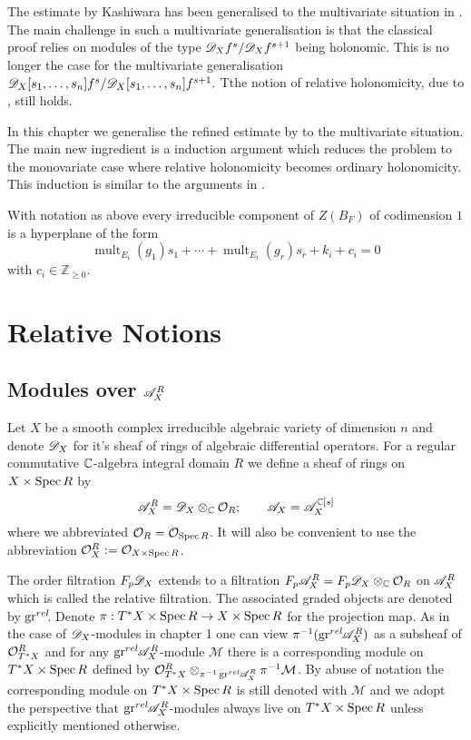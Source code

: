 The estimate by Kashiwara has been generalised to the multivariate situation in \cite{budur2020zero}.
The main challenge in such a multivariate generalisation is that the classical proof relies on modules of the type $\mathscr{D}_X f^{s}/ \mathscr{D}_X f^{s+1}$ being holonomic.
This is no longer the case for the multivariate generalisation $\mathscr{D}_X[s_1,\ldots, s_n]f^s /\mathscr{D}_X[s_1,\ldots, s_n]f^{s+1}.$
Tthe notion of relative holonomicity, due to \cite{maisonobe2016filtration}, still holds.

In this chapter we generalise the refined estimate by \cite{lichtin1989poles} to the multivariate situation.
The main new ingredient is a induction argument which reduces the problem to the monovariate case where relative holonomicity becomes ordinary holonomicity.
This induction is similar to the arguments in \cite{budur2019zero}.
\begin{theorem}\label{thm: EstimateBernsteinSatoZeroLocust}
  With notation as above every irreducible component of $Z(B_F)$ of codimension $1$ is a hyperplane of the form
  $$\operatorname{mult}_{E_i}(g_1) s_1 + \cdots + \operatorname{mult}_{E_i}(g_r)s_r + k_i + c_i=0$$
  with $c_i \in \mathbb{Z}_{\geq 0 }$.
\end{theorem}
\section{Relative Notions}
\subsection{Modules over $\mathscr{A}_X^R$}
Let $X$ be a smooth complex irreducible algebraic variety of dimension $n$ and denote $\mathscr{D}_X$ for it's sheaf of rings of algebraic differential operators.
For a regular commutative $\mathbb{C}$-algebra integral domain $R$ we define a sheaf of rings on $X\times \operatorname{Spec} R$ by
$$\mathscr{A}_{X}^R = \mathscr{D}_X \otimes_{\mathbb{C}} \mathcal{O}_{R}; \qquad \mathscr{A}_X = \mathscr{A}_{X}^{\mathbb{C}[s]}$$
where we abbreviated $\mathcal{O}_R = \mathcal{O}_{\operatorname{Spec} R}$. It will also be convenient to use the abbreviation $\mathcal{O}_{X}^R := \mathcal{O}_{X \times \operatorname{Spec} R}$.


The order filtration $F_p\mathscr{D}_X$ extends to a filtration $F_p\mathscr{A}^R_X = F_p\mathscr{D}_X \otimes_{\mathbb{C}} \mathcal{O}_R$ on $\mathscr{A}^R_X$ which is called the relative filtration.
The associated graded objects are denoted by $\operatorname{gr}^{rel}\mkern-5mu$. Denote $\pi:T^*X\times \operatorname{Spec} R \to X\times \operatorname{Spec} R$ for the projection map.
As in the case of $\mathscr{D}_X$-modules in chapter 1  one can view $\pi^{-1}(\operatorname{gr}^{rel}\mkern-5mu\mathscr{A}_X^R)$ as a subsheaf of $\mathcal{O}_{T^*X}^R$ and for any $\operatorname{gr}^{rel}\mkern-5mu\mathscr{A}_X^R$-module $\mathcal{M}$ there is a corresponding module on $T^*X\times \operatorname{Spec} R$ defined by $\mathcal{O}_{T^*X}^R\otimes_{\pi^{-1}\operatorname{gr}^{rel}\mkern-5mu\mathscr{A}_X^R}\pi^{-1}\mathcal{M}$.
By abuse of notation the corresponding module on $T^*X\times \operatorname{Spec} R$ is still denoted with $\mathcal{M}$ and we adopt the perspective that $\operatorname{gr}^{rel}\mkern-5mu\mathscr{A}_X^R$-modules always live on $T^*X\times \operatorname{Spec} R$ unless explicitly mentioned otherwise.


